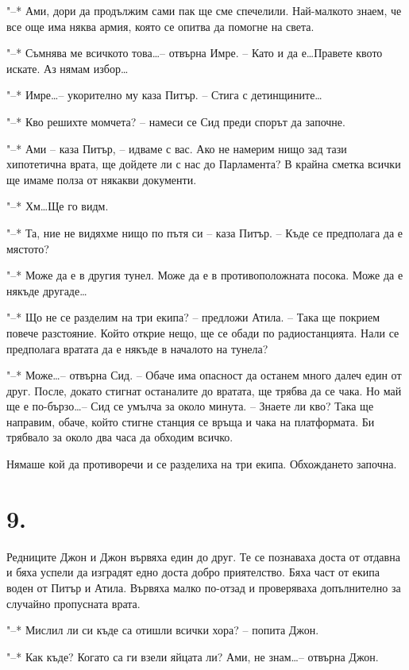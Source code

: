 \documentclass[ebook,openany,12pt]{memoir}
\begin{document}
"--* Ами, дори да продължим сами пак ще сме спечелили. Най-малкото знаем, че все още има няква армия, която се опитва да помогне на света.

"--* Съмнява ме всичкото това\ldots -- отвърна Имре. – Като и да е\ldots Правете квото искате. Аз нямам избор\ldots

"--* Имре\ldots -- укорително му каза Питър. – Стига с детинщините\ldots

"--* Кво решихте момчета? – намеси се Сид преди спорът да започне.

"--* Ами -- каза Питър, -- идваме с вас. Ако не намерим нищо зад тази хипотетична врата, ще дойдете ли с нас до Парламента? В крайна сметка всички ще имаме полза от някакви документи.

"--* Хм\ldots Ще го видм.

"--* Та, ние не видяхме нищо по пътя си – каза Питър. – Къде се предполага да е мястото?

"--* Може да е в другия тунел. Може да е в противоположната посока. Може да е някъде другаде\ldots

"--* Що не се разделим на три екипа? – предложи Атила. – Така ще покрием повече разстояние. Който открие нещо, ще се обади по радиостанцията. Нали се предполага вратата да е някъде в началото на тунела?

"--* Може\ldots -- отвърна Сид. -- Обаче има опасност да останем много далеч един от друг. После, докато стигнат останалите до вратата, ще трябва да се чака. Но май ще е по-бързо\ldots -- Сид се умълча за около минута. – Знаете ли кво? Така ще направим, обаче, който стигне станция се връща и чака на платформата. Би трябвало за около два часа да обходим всичко.

Нямаше кой да противоречи и се разделиха на три екипа. Обхождането започна.

\section*{9.}

Редниците Джон и Джон вървяха един до друг. Те се познаваха доста от отдавна и бяха успели да изградят едно доста добро приятелство. Бяха част от екипа воден от Питър и Атила. Вървяха малко по-отзад и проверяваха допълнително за случайно пропусната врата. 

"--* Мислил ли си къде са отишли всички хора? – попита Джон.

"--* Как къде? Когато са ги взели яйцата ли? Ами, не знам\ldots -- отвърна Джон.
\end{document}
